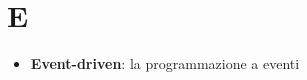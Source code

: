 \section{E}
\begin{itemize} 
	\item
	\textbf{Event-driven}: la programmazione a eventi 
\end{itemize}